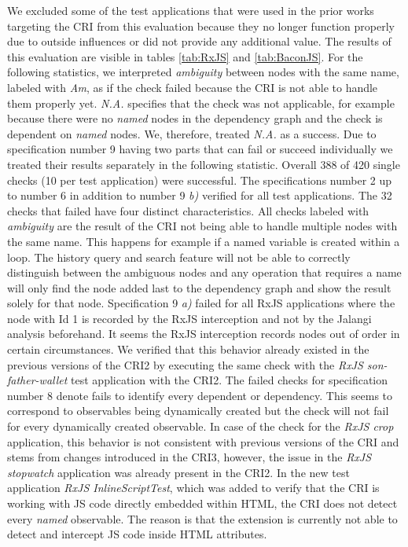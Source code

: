 We excluded some of the test applications that were used in the prior works targeting the CRI from this evaluation because they no longer function properly due to outside influences or did not provide any additional value. The results of this evaluation are visible in tables \ref{tab:RxJS} and \ref{tab:BaconJS}. For the following statistics, we interpreted \emph{ambiguity} between nodes with the same name, labeled with \emph{Am}, as if the check failed because the CRI is not able to handle them properly yet. \emph{N.A.} specifies that the check was not applicable, for example because there were no \emph{named} nodes in the dependency graph and the check is dependent on \emph{named} nodes. We, therefore, treated \emph{N.A.} as a success. Due to specification number 9 having two parts that can fail or succeed individually we treated their results separately in the following statistic. Overall 388 of 420 single checks (10 per test application) were successful. The specifications number 2 up to number 6 in addition to number 9 \emph{b)} verified for all test applications. The 32 checks that failed have four distinct characteristics. All checks labeled with \emph{ambiguity} are the result of the CRI not being able to handle multiple nodes with the same name. This happens for example if a named variable is created within a loop. The history query and search feature will not be able to correctly distinguish between the ambiguous nodes and any operation that requires a name will only find the node added last to the dependency graph and show the result solely for that node. Specification 9 \emph{a)} failed for all RxJS applications where the node with Id 1 is recorded by the RxJS interception and not by the Jalangi analysis beforehand. It seems the RxJS interception records nodes out of order in certain circumstances. We verified that this behavior already existed in the previous versions of the CRI2 by executing the same check with the \emph{RxJS son-father-wallet} test application with the CRI2. The failed checks for specification number 8 denote fails to identify every dependent or dependency. This seems to correspond to observables being dynamically created but the check will not fail for every dynamically created observable. In case of the check for the \emph{RxJS crop} application, this behavior is not consistent with previous versions of the CRI and stems from changes introduced in the CRI3, however, the issue in the \emph{RxJS stopwatch} application was already present in the CRI2.
In the new test application \emph{RxJS InlineScriptTest}, which was added to verify that the CRI is working with JS code directly embedded within HTML, the CRI does not detect every \emph{named} observable. The reason is that the extension is currently not able to detect and intercept JS code inside HTML attributes.
